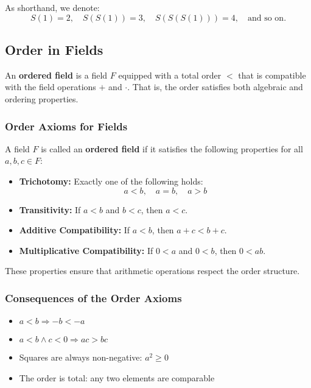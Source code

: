 As shorthand, we denote:
\[
	S(1) = 2, \quad S(S(1)) = 3, \quad S(S(S(1))) = 4, \quad \text{and so on.}
\]

\subsection{Order in Fields}

An \textbf{ordered field} is a field \( F \) equipped with a total order \( < \) that is compatible with the field operations \( + \) and \( \cdot \). That is, the order satisfies both algebraic and ordering properties.

\subsubsection{Order Axioms for Fields}

A field \( F \) is called an \textbf{ordered field} if it satisfies the following properties for all \( a, b, c \in F \):

\begin{itemize}[label=\(-\)]
    \item \textbf{Trichotomy:} Exactly one of the following holds:
    \[
    a < b, \quad a = b, \quad a > b
    \]

    \item \textbf{Transitivity:} If \( a < b \) and \( b < c \), then \( a < c \).

    \item \textbf{Additive Compatibility:} If \( a < b \), then \( a + c < b + c \).

    \item \textbf{Multiplicative Compatibility:} If \( 0 < a \) and \( 0 < b \), then \( 0 < ab \).
\end{itemize}

These properties ensure that arithmetic operations respect the order structure.

\subsubsection{Consequences of the Order Axioms}

\begin{itemize}[label=\(-\)]
    \item \( a < b \Rightarrow -b < -a \)
    \item \( a < b \land c < 0 \Rightarrow ac > bc \)
    \item Squares are always non-negative: \( a^2 \ge 0 \)
    \item The order is total: any two elements are comparable
\end{itemize}

